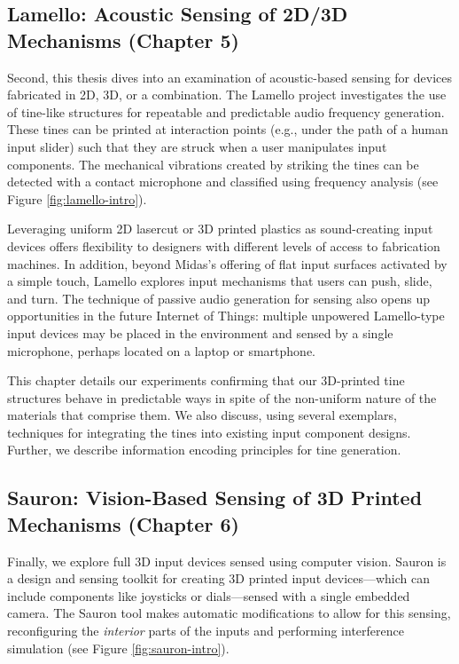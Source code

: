 \subsection{Lamello: Acoustic Sensing of 2D/3D Mechanisms (Chapter 5)}

Second, this thesis dives into an examination of acoustic-based sensing for devices fabricated in 2D, 3D, or a combination. The Lamello project investigates the use of tine-like structures for repeatable and predictable audio frequency generation. These tines can be printed at interaction points (e.g., under the path of a human input slider) such that they are struck when a user manipulates input components. The mechanical vibrations created by striking the tines can be detected with a contact microphone and classified using frequency analysis (see Figure \ref{fig:lamello-intro}).

Leveraging uniform 2D lasercut or 3D printed plastics as sound-creating input devices offers flexibility to designers with different levels of access to fabrication machines. In addition, beyond Midas's offering of flat input surfaces activated by a simple touch, Lamello explores input mechanisms that users can push, slide, and turn. The technique of passive audio generation for sensing also opens up opportunities in the future Internet of Things: multiple unpowered Lamello-type input devices may be placed in the environment and sensed by a single microphone, perhaps located on a laptop or smartphone.

This chapter details our experiments confirming that our 3D-printed tine structures behave in predictable ways in spite of the non-uniform nature of the materials that comprise them. We also discuss, using several exemplars, techniques for integrating the tines into existing input component designs. Further, we describe information encoding principles for tine generation.

\subsection{Sauron: Vision-Based Sensing of 3D Printed Mechanisms (Chapter 6)}

Finally, we explore full 3D input devices sensed using computer vision. Sauron is a design and sensing toolkit for creating 3D printed input devices---which can include components like joysticks or dials---sensed with a single embedded camera. The Sauron tool makes automatic modifications to allow for this sensing, reconfiguring the \emph{interior} parts of the inputs and performing interference simulation (see Figure \ref{fig:sauron-intro}).

